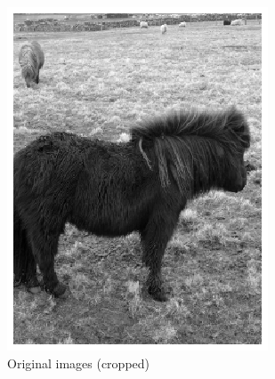 \documentclass{l4proj}
\begin{document}
\begin{figure}[ht]
  \centering
  \begin{subfigure}[h!]{0.25\textwidth}
    \includegraphics[width=\textwidth]{images/unet/pony_grayscale.png}
    \caption{Original images (cropped)}
  \end{subfigure}
  \begin{subfigure}[h!]{0.25\textwidth}

\end{subfigure}
\end{figure}
\end{document}
